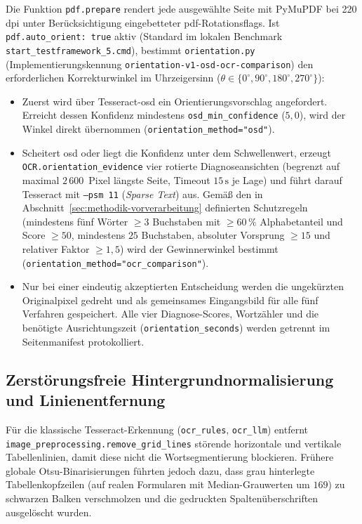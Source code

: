 Die Funktion \texttt{pdf.prepare} rendert jede ausgewählte Seite mit PyMuPDF bei \mbox{220\,\ac{dpi}} unter Berücksichtigung eingebetteter \ac{pdf}-Rotationsflags. Ist \texttt{pdf.auto\_orient: true} aktiv (Standard im lokalen Benchmark \texttt{start\_testframework\_5.cmd}), bestimmt \texttt{orientation.py} (Implementierungskennung \texttt{orientation-v1-osd-ocr-comparison}) den erforderlichen Korrekturwinkel im Uhrzeigersinn ($\theta \in \{0^\circ, 90^\circ, 180^\circ, 270^\circ\}$):
\begin{itemize}
  \item Zuerst wird über Tesseract-\ac{osd} ein Orientierungsvorschlag angefordert. Erreicht dessen Konfidenz mindestens \texttt{osd\_min\_confidence} ($5{,}0$), wird der Winkel direkt übernommen (\texttt{orientation\_method="osd"}).
  \item Scheitert \ac{osd} oder liegt die Konfidenz unter dem Schwellenwert, erzeugt \texttt{OCR.orientation\_evidence} vier rotierte Diagnoseansichten (begrenzt auf maximal $2\,600$~Pixel längste Seite, Timeout $15\,\mathrm{s}$ je Lage) und führt darauf Tesseract mit \texttt{--psm 11} (\emph{Sparse Text}) aus. Gemäß den in Abschnitt~\ref{sec:methodik-vorverarbeitung} definierten Schutzregeln (mindestens fünf Wörter $\ge 3$ Buchstaben mit $\ge 60\,\%$ Alphabetanteil und Score $\ge 50$, mindestens $25$ Buchstaben, absoluter Vorsprung $\ge 15$ und relativer Faktor $\ge 1{,}5$) wird der Gewinnerwinkel bestimmt (\texttt{orientation\_method="ocr\_comparison"}).
  \item Nur bei einer eindeutig akzeptierten Entscheidung werden die ungekürzten Originalpixel gedreht und als gemeinsames Eingangsbild für alle fünf Verfahren gespeichert. Alle vier Diagnose-Scores, Wortzähler und die benötigte Ausrichtungszeit (\texttt{orientation\_seconds}) werden getrennt im Seitenmanifest protokolliert.
\end{itemize}

\subsection{Zerstörungsfreie Hintergrundnormalisierung und Linienentfernung}
\label{subsec:umsetzung-hintergrund}

Für die klassische Tesseract-Erkennung (\texttt{ocr\_rules}, \texttt{ocr\_llm}) entfernt \texttt{image\_preprocessing.\allowbreak remove\_grid\_lines} störende horizontale und vertikale Tabellenlinien, damit diese nicht die Wortsegmentierung blockieren. Frühere globale Otsu-Binarisierungen führten jedoch dazu, dass grau hinterlegte Tabellenkopfzeilen (auf realen Formularen mit Median-Grauwerten um $169$) zu schwarzen Balken verschmolzen und die gedruckten Spaltenüberschriften ausgelöscht wurden.

